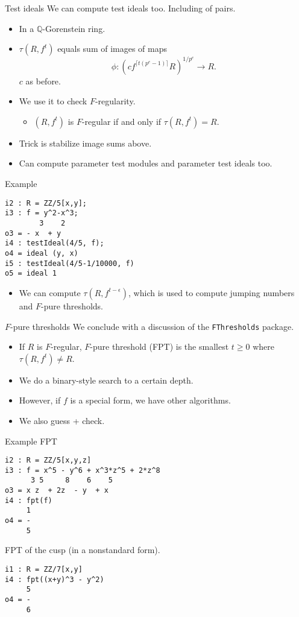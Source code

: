 \documentclass[xcolor=dvipsnames]{beamer}
\newcommand{\bQ}{\mathbb{Q}}
\theoremstyle{remark}
\begin{document}
\begin{frame}[t]{Test ideals}
    We can compute test ideals too.  Including of pairs.
    \begin{itemize}
        \item<2-> In a $\bQ$-Gorenstein ring.
        \item<3-> $\tau(R, f^t)$ equals sum of images of maps
        \[
        \phi : (cf^{\lceil t(p^e - 1)\rceil} R)^{1/p^e} \to R.
        \]
        $c$ as before.
        \item<4->  We use it to check $F$-regularity.
        \begin{itemize}
            \item<5->  $(R, f^t)$ is $F$-regular if and only if $\tau(R, f^t) = R$.
        \end{itemize}
        \item<6->  Trick is stabilize image sums above.
        \item<7->  Can compute parameter test modules and parameter test ideals too.
    \end{itemize}
\end{frame}


\begin{frame}[fragile]{Example}
\begin{verbatim}
i2 : R = ZZ/5[x,y];
i3 : f = y^2-x^3;
        3    2
o3 = - x  + y
i4 : testIdeal(4/5, f);
o4 = ideal (y, x)
i5 : testIdeal(4/5-1/10000, f)
o5 = ideal 1
\end{verbatim}
\begin{itemize}
\item<2->We can compute $\tau(R, f^{t-\epsilon})$, which is used to compute jumping numbers and $F$-pure thresholds.
\end{itemize}
\end{frame}


\begin{frame}[fragile]{$F$-pure thresholds}
    We conclude with a discussion of the {\tt FThresholds} package.
    \begin{itemize}
        \item<2->  If $R$ is $F$-regular, $F$-pure threshold (FPT) is the smallest $t \geq 0$ where $\tau(R, f^t) \neq R$.
        \item<3->  We do a binary-style search to a certain depth.
        \item<4->  However, if $f$ is a special form, we have other algorithms.
        \item<5->  We also guess + check.
    \end{itemize}
\end{frame}

\begin{frame}[fragile]{Example FPT}
\begin{verbatim}
i2 : R = ZZ/5[x,y,z]
i3 : f = x^5 - y^6 + x^3*z^5 + 2*z^8
      3 5     8    6    5
o3 = x z  + 2z  - y  + x
i4 : fpt(f)
     1
o4 = -
     5
\end{verbatim}
FPT of the cusp (in a nonstandard form).
\begin{verbatim}
i1 : R = ZZ/7[x,y]
i4 : fpt((x+y)^3 - y^2)
     5
o4 = -
     6
\end{verbatim}
\end{frame}
\end{document}

